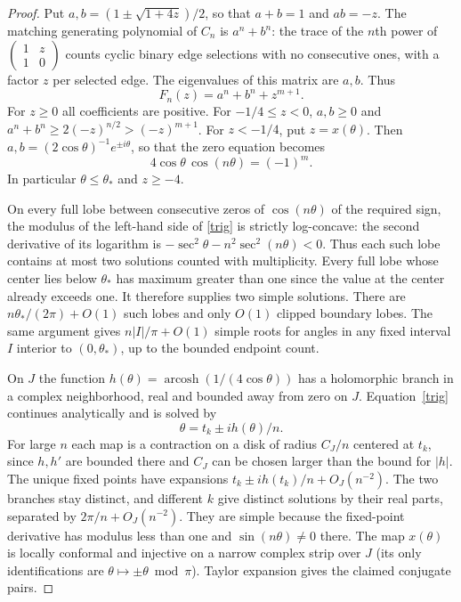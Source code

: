 \documentclass[11pt]{article}
\DeclareMathOperator{\arcosh}{arcosh}
\begin{document}
\begin{proof}
Put $a,b=(1\pm\sqrt{1+4z})/2$, so that $a+b=1$ and $ab=-z$. The matching generating polynomial of $C_n$ is $a^n+b^n$: the trace of the $n$th power of $\left(\begin{smallmatrix}1&z\\1&0\end{smallmatrix}\right)$ counts cyclic binary edge selections with no consecutive ones, with a factor $z$ per selected edge. The eigenvalues of this matrix are $a,b$. Thus
\[
 F_n(z)=a^n+b^n+z^{m+1}.
\]
For $z\ge0$ all coefficients are positive. For $-1/4\le z<0$, $a,b\ge0$ and $a^n+b^n\ge2(-z)^{n/2} > (-z)^{m+1}$. For $z<-1/4$, put $z=x(\theta)$. Then $a,b=(2\cos\theta)^{-1}e^{\pm i\theta}$, so that the zero equation becomes
\begin{equation}\label{trig}
 4\cos\theta\,\cos(n\theta)=(-1)^m.
\end{equation}
In particular $\theta\le\theta_*$ and $z\ge-4$.

On every full lobe between consecutive zeros of $\cos(n\theta)$ of the required sign, the modulus of the left-hand side of \eqref{trig} is strictly log-concave: the second derivative of its logarithm is $-\sec^2\theta-n^2\sec^2(n\theta)<0$. Thus each such lobe contains at most two solutions counted with multiplicity. Every full lobe whose center lies below $\theta_*$ has maximum greater than one since the value at the center already exceeds one. It therefore supplies two simple solutions. There are $n\theta_* /(2\pi)+O(1)$ such lobes and only $O(1)$ clipped boundary lobes. The same argument gives $n|I|/\pi+O(1)$ simple roots for angles in any fixed interval $I$ interior to $(0,\theta_*)$, up to the bounded endpoint count.

On $J$ the function $h(\theta)=\arcosh(1/(4\cos\theta))$ has a holomorphic branch in a complex neighborhood, real and bounded away from zero on $J$. Equation~\eqref{trig} continues analytically and is solved by
\[
 \theta=t_k\pm i h(\theta)/n.
\]
For large $n$ each map is a contraction on a disk of radius $C_J/n$ centered at $t_k$, since $h,h'$ are bounded there and $C_J$ can be chosen larger than the bound for $|h|$. The unique fixed points have expansions $t_k\pm ih(t_k)/n+O_J(n^{-2})$. The two branches stay distinct, and different $k$ give distinct solutions by their real parts, separated by $2\pi/n+O_J(n^{-2})$. They are simple because the fixed-point derivative has modulus less than one and $\sin(n\theta)\ne0$ there. The map $x(\theta)$ is locally conformal and injective on a narrow complex strip over $J$ (its only identifications are $\theta\mapsto\pm\theta\bmod\pi$). Taylor expansion gives the claimed conjugate pairs.


\end{proof}
\end{document}
